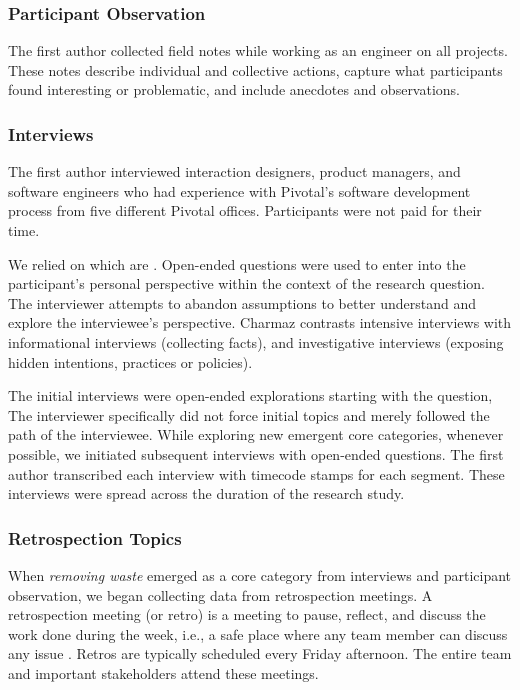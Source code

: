 \subsubsection{Participant Observation}
The first author collected field notes while working as an engineer on all \numberOfObservedProjects{} projects. These notes describe individual and collective actions, capture what participants found interesting or problematic, and include anecdotes and observations.
\subsubsection{Interviews}
The first author interviewed \numberOfInterviews{} interaction designers, product managers, and software engineers who had experience with Pivotal's software development process from five different Pivotal offices. Participants were not paid for their time.


We relied on  which are  \cite{Charmaz}. Open-ended questions were used to enter into the participant's personal perspective within the context of the research question. The interviewer attempts to abandon assumptions to better understand and explore the interviewee's perspective. Charmaz \cite{Charmaz} contrasts intensive interviews with informational interviews (collecting facts), and investigative interviews (exposing hidden intentions, practices or policies).


The initial interviews were open-ended explorations starting with the question,  The interviewer specifically did not force initial topics and merely followed the path of the interviewee. While exploring new emergent core categories, whenever possible, we initiated subsequent interviews with open-ended questions. The first author transcribed each interview with timecode stamps for each segment. These interviews were spread across the duration of the research study. 
\subsubsection{Retrospection Topics}
When \textit{removing waste} emerged as a core category from interviews and participant observation, we began collecting data from retrospection meetings. A retrospection meeting (or retro) is a meeting to pause, reflect, and discuss the work done during the week, i.e., a safe place where any team member can discuss any issue \cite{DerbyAgileRetrospectives}. Retros are typically scheduled every Friday afternoon. The entire team and important stakeholders attend these meetings. 


